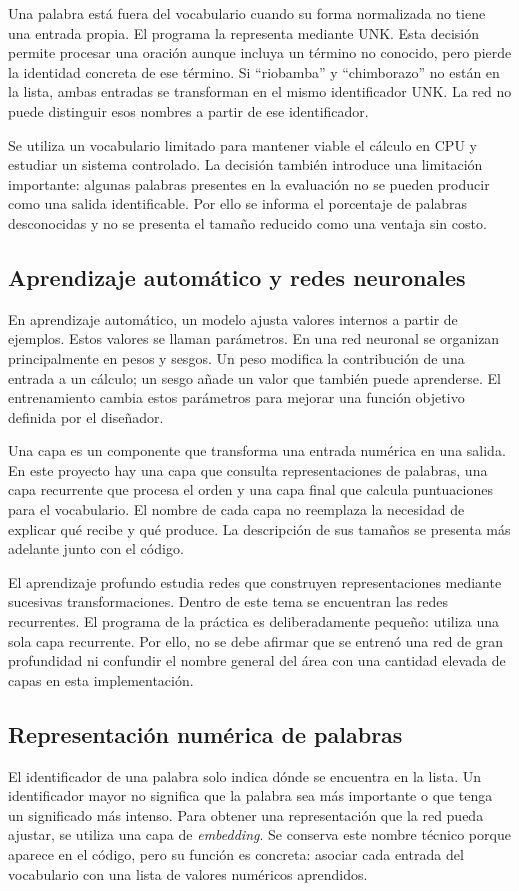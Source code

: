 Una palabra está fuera del vocabulario cuando su forma normalizada no tiene una entrada propia. El programa la representa mediante UNK. Esta decisión permite procesar una oración aunque incluya un término no conocido, pero pierde la identidad concreta de ese término. Si ``riobamba'' y ``chimborazo'' no están en la lista, ambas entradas se transforman en el mismo identificador UNK. La red no puede distinguir esos nombres a partir de ese identificador.

Se utiliza un vocabulario limitado para mantener viable el cálculo en CPU y estudiar un sistema controlado. La decisión también introduce una limitación importante: algunas palabras presentes en la evaluación no se pueden producir como una salida identificable. Por ello se informa el porcentaje de palabras desconocidas y no se presenta el tamaño reducido como una ventaja sin costo.

\subsection{Aprendizaje automático y redes neuronales}
En aprendizaje automático, un modelo ajusta valores internos a partir de ejemplos. Estos valores se llaman parámetros. En una red neuronal se organizan principalmente en pesos y sesgos. Un peso modifica la contribución de una entrada a un cálculo; un sesgo añade un valor que también puede aprenderse. El entrenamiento cambia estos parámetros para mejorar una función objetivo definida por el diseñador.

Una capa es un componente que transforma una entrada numérica en una salida. En este proyecto hay una capa que consulta representaciones de palabras, una capa recurrente que procesa el orden y una capa final que calcula puntuaciones para el vocabulario. El nombre de cada capa no reemplaza la necesidad de explicar qué recibe y qué produce. La descripción de sus tamaños se presenta más adelante junto con el código.

El aprendizaje profundo estudia redes que construyen representaciones mediante sucesivas transformaciones. Dentro de este tema se encuentran las redes recurrentes. El programa de la práctica es deliberadamente pequeño: utiliza una sola capa recurrente. Por ello, no se debe afirmar que se entrenó una red de gran profundidad ni confundir el nombre general del área con una cantidad elevada de capas en esta implementación.

\subsection{Representación numérica de palabras}
El identificador de una palabra solo indica dónde se encuentra en la lista. Un identificador mayor no significa que la palabra sea más importante o que tenga un significado más intenso. Para obtener una representación que la red pueda ajustar, se utiliza una capa de \emph{embedding}. Se conserva este nombre técnico porque aparece en el código, pero su función es concreta: asociar cada entrada del vocabulario con una lista de valores numéricos aprendidos.

